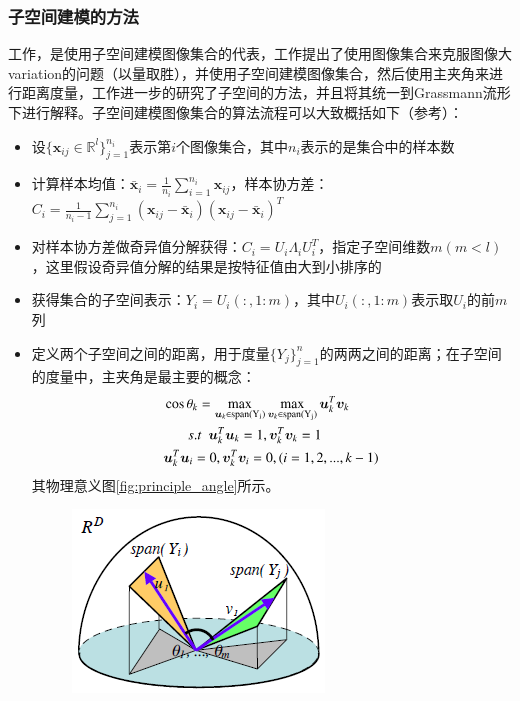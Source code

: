 \subsubsection{子空间建模的方法}
\label{sec:current_SubMan_Subspace}
工作\cite{Subspace_MSM}，\cite{Subspace_GDA}是使用子空间建模图像集合的代表，工作\cite{Subspace_MSM}提出了使用图像集合来克服图像大variation的问题（以量取胜），并使用子空间建模图像集合，然后使用主夹角来进行距离度量，工作\cite{Subspace_GDA}进一步的研究了子空间的方法，并且将其统一到Grassmann流形下进行解释。子空间建模图像集合的算法流程可以大致概括如下（参考\cite{Subspace_GDA}）：
\begin{itemize}
\item 设$\{\bm{x}_{ij} \in \mathbb{R}^{l}\}_{j=1}^{n_i}$表示第$i$个图像集合，其中$n_i$表示的是集合中的样本数
\item 计算样本均值：$\bar{\bm{x}}_i=\frac{1}{n_i}\sum_{i=1}^{n_i} \bm{x}_{ij}$，样本协方差：$C_i=\frac{1}{n_i-1}\sum_{j=1}^{n_i}(\bm{x}_{ij}-\bar{\bm{x}}_i)(\bm{x}_{ij}-\bar{\bm{x}}_i)^{T}$
\item 对样本协方差做奇异值分解获得：$C_i=U_i\Lambda_iU_{i}^{T}$，指定子空间维数$m(m<l)$，这里假设奇异值分解的结果是按特征值由大到小排序的
\item 获得集合的子空间表示：$Y_i=U_i(:,1:m)$，其中$U_i(:,1:m)$表示取$U_i$的前$m$列
\item 定义两个子空间之间的距离，用于度量$\{Y_j\}_{j=1}^n$的两两之间的距离；在子空间的度量中，主夹角是最主要的概念：
\begin{equation}
\label{principal_angle}
\begin{split}
&\cos \theta_{k}=\max_{\bm{u}_k \in {\rm span(Y_i)}}\max_{\bm{v}_k \in {\rm span(Y_j)}} \bm{u}_{k}^{T}\bm{v}_{k}\\
&~~~~~~~s.t~~\bm{u}_{k}^{T}\bm{u}_{k}=1,\bm{v}_{k}^{T}\bm{v}_{k}=1\\
&\bm{u}_{k}^{T}\bm{u}_{i}=0,\bm{v}_{k}^{T}\bm{v}_{i}=0,(i=1,2,...,k-1)\\
\end{split}
\end{equation}
其物理意义图\ref{fig:principle_angle}所示。
\begin{figure}[h]
	\centering
	\includegraphics[width=0.4\linewidth]{source/principal_angle.png}

\end{figure}
\end{itemize}
